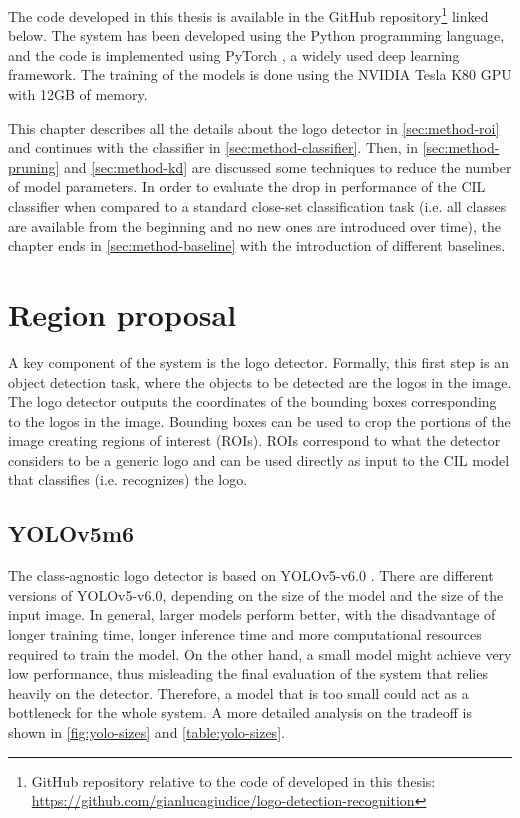 The code developed in this thesis is available in the GitHub repository\footnote{GitHub repository relative to the code of developed in this thesis: \\ \href{https://github.com/gianlucagiudice/logo-detection-recognition}{https://github.com/gianlucagiudice/logo-detection-recognition}} linked below. The system has been developed using the Python programming language, and the code is implemented using PyTorch \cite{paszke2019pytorch}, a widely used deep learning framework. The training of the models is done using the NVIDIA Tesla K80 GPU with 12GB of memory.

\vspace{1.5\baselineskip}
This chapter describes all the details about the logo detector in \autoref{sec:method-roi} and continues with the classifier in \autoref{sec:method-classifier}. Then, in \autoref{sec:method-pruning} and \autoref{sec:method-kd} are discussed some techniques to reduce the number of model parameters. In order to evaluate the drop in performance of the CIL classifier when compared to a standard close-set classification task (i.e. all classes are available from the beginning and no new ones are introduced over time),
the chapter ends in \autoref{sec:method-baseline} with the introduction of different baselines.

\section{Region proposal}
A key component of the system is the logo detector. Formally, this first step is an object detection task, where the objects to be detected are the logos in the image. The logo detector outputs the coordinates of the bounding boxes corresponding to the logos in the image.
Bounding boxes can be used to crop the portions of the image creating regions of interest (ROIs). ROIs correspond to what the detector considers to be a generic logo and can be used directly as input to the CIL model that classifies (i.e. recognizes) the logo.

\label{sec:method-roi}
\subsection{YOLOv5m6}
The class-agnostic logo detector is based on YOLOv5-v6.0 \cite{glenn_jocher_2021_5563715}. There are different versions of YOLOv5-v6.0, depending on the size of the model and the size of the input image.
In general, larger models perform better, with the disadvantage of longer training time, longer inference time and more computational resources required to train the model.
On the other hand, a small model might achieve very low performance, thus misleading the final evaluation of the system that relies heavily on the detector.
Therefore, a model that is too small could act as a bottleneck for the whole system. A more detailed analysis on the tradeoff is shown in \autoref{fig:yolo-sizes} and \autoref{table:yolo-sizes}.

